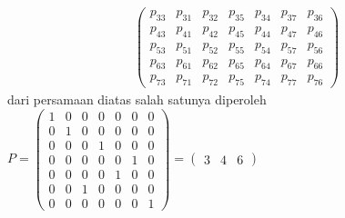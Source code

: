 \documentclass[11pt,a4paper]{article}
\theoremstyle{plain}
\theoremstyle{definition}
\theoremstyle{remark}
\begin{document}
\begin{enumerate}
\begin{enumerate}
\begin{enumerate}
\begin{align*}
\begin{pmatrix}
	p_{33} & p_{31} & p_{32} & p_{35} & p_{34} & p_{37} & p_{36}\\ 
	p_{43} & p_{41} & p_{42} & p_{45} & p_{44} & p_{47} & p_{46}\\ 
	p_{53} & p_{51} & p_{52} & p_{55} & p_{54} & p_{57} & p_{56}\\ 
	p_{63} & p_{61} & p_{62} & p_{65} & p_{64} & p_{67} & p_{66}\\ 
	p_{73} & p_{71} & p_{72} & p_{75} & p_{74} & p_{77} & p_{76}
	\end{pmatrix}
	\end{align*}
	dari persamaan diatas salah satunya diperoleh $P=\begin{pmatrix}
	1 & 0 & 0 & 0 & 0 & 0 & 0\\ 
	0 & 1 & 0 & 0 & 0 & 0 & 0\\ 
	0 & 0 & 0 & 1 & 0 & 0 & 0\\ 
	0 & 0 & 0 & 0 & 0 & 1 & 0\\ 
	0 & 0 & 0 & 0 & 1 & 0 & 0\\ 
	0 & 0 & 1 & 0 & 0 & 0 & 0\\ 
	0 & 0 & 0 & 0 & 0 & 0 & 1
	\end{pmatrix} = \begin{pmatrix}
		3 & 4 & 6
	\end{pmatrix} $
	

\end{enumerate}
\end{enumerate}
\end{enumerate}
\end{document}
